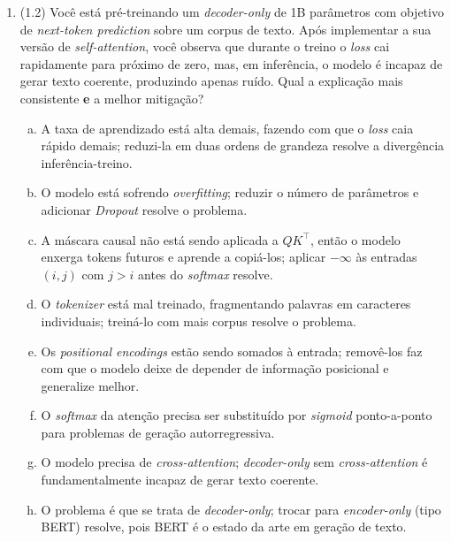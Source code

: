 \documentclass[11pt,a4paper]{article}
\begin{document}
\begin{enumerate}[1)]
\item (1.2) Você está pré-treinando um \textit{decoder-only} de 1B parâmetros com objetivo de \textit{next-token prediction} sobre um corpus de texto. Após implementar a sua versão de \textit{self-attention}, você observa que durante o treino o \textit{loss} cai rapidamente para próximo de zero, mas, em inferência, o modelo é incapaz de gerar texto coerente, produzindo apenas ruído. Qual a explicação mais consistente \textbf{e} a melhor mitigação?
\begin{enumerate}[a)]
    \item A taxa de aprendizado está alta demais, fazendo com que o \textit{loss} caia rápido demais; reduzi-la em duas ordens de grandeza resolve a divergência inferência-treino.
    \item O modelo está sofrendo \textit{overfitting}; reduzir o número de parâmetros e adicionar \textit{Dropout} resolve o problema.
    \item A máscara causal não está sendo aplicada a $QK^\top$, então o modelo enxerga tokens futuros e aprende a copiá-los; aplicar $-\infty$ às entradas $(i, j)$ com $j > i$ antes do \textit{softmax} resolve.
    \item O \textit{tokenizer} está mal treinado, fragmentando palavras em caracteres individuais; treiná-lo com mais corpus resolve o problema.
    \item Os \textit{positional encodings} estão sendo somados à entrada; removê-los faz com que o modelo deixe de depender de informação posicional e generalize melhor.
    \item O \textit{softmax} da atenção precisa ser substituído por \textit{sigmoid} ponto-a-ponto para problemas de geração autorregressiva.
    \item O modelo precisa de \textit{cross-attention}; \textit{decoder-only} sem \textit{cross-attention} é fundamentalmente incapaz de gerar texto coerente.
    \item O problema é que se trata de \textit{decoder-only}; trocar para \textit{encoder-only} (tipo BERT) resolve, pois BERT é o estado da arte em geração de texto.
\end{enumerate}


\end{enumerate}
\end{document}
